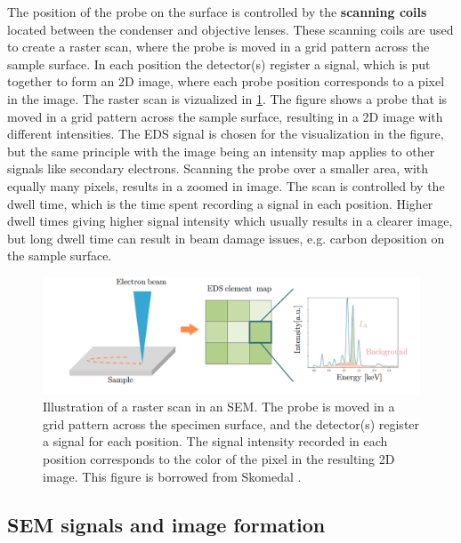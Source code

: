 The position of the probe on the surface is controlled by the \textbf{scanning coils} located between the condenser and objective lenses.
These scanning coils are used to create a raster scan, where the probe is moved in a grid pattern across the sample surface.
In each position the detector(s) register a signal, which is put together to form an 2D image, where each probe position corresponds to a pixel in the image.
The raster scan is vizualized in \cref{fig:sem_rasterscan}.
The figure shows a probe that is moved in a grid pattern across the sample surface, resulting in a 2D image with different intensities.
The EDS signal is chosen for the visualization in the figure, but the same principle with the image being an intensity map applies to other signals like secondary electrons.
Scanning the probe over a smaller area, with equally many pixels, results in a zoomed in image.
The scan is controlled by the dwell time, which is the time spent recording a signal in each position.
Higher dwell times giving higher signal intensity which usually results in a clearer image, but long dwell time can result in beam damage issues, e.g. carbon deposition on the sample surface.

\begin{figure}[ht]
    \centering
    \includegraphics[width=0.8\linewidth]{figures/SEM_raster.png}
    \caption{
        Illustration of a raster scan in an SEM.
        The probe is moved in a grid pattern across the specimen surface, and the detector(s) register a signal for each position.
        The signal intensity recorded in each position corresponds to the color of the pixel in the resulting 2D image.
        This figure is borrowed from Skomedal \cite[Fig. 2.14]{skomedal_improving_2022}.
    }
    \label{fig:sem_rasterscan}
\end{figure}






\subsection{SEM signals and image formation}
\label{theory:sem:sem_signals}

